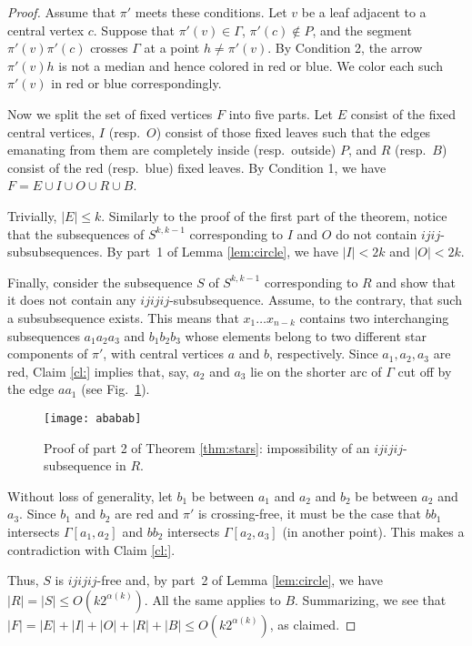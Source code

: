 \documentclass[reqno,12pt]{amsart}
\newcounter{claim}
\begin{document}
\begin{proof}
Assume that $\pi'$ meets these conditions.
Let $v$ be a leaf adjacent to a central
vertex $c$. Suppose that $\pi'(v)\in\Gamma$, $\pi'(c)\notin P$, and the segment
$\pi'(v)\pi'(c)$ crosses $\Gamma$ at a point $h\ne\pi'(v)$. By Condition 2,
the arrow $\pi'(v)h$ is not a median and hence colored in red or blue. 
We color each such $\pi'(v)$ in red or blue correspondingly.

Now we split the set of fixed vertices $F$ into five parts. 
Let $E$ consist of the fixed central vertices,
$I$ (resp.\ $O$) consist of those fixed leaves such that the edges emanating
from them are completely inside (resp.\ outside) $P$, and
$R$ (resp.\ $B$) consist of the red (resp.\ blue) fixed leaves.
By Condition 1, we have $F=E\cup I\cup O\cup R\cup B$.


Trivially, $|E|\le k$. Similarly to the proof of the first part of the theorem,
notice that the subsequences of $S^{k,k-1}$ corresponding to $I$ and $O$
do not contain $ijij$-subsubsequences. By part~1 of Lemma \ref{lem:circle},
we have $|I|<2k$ and $|O|<2k$. 

Finally, consider the subsequence $S$ of $S^{k,k-1}$ corresponding to $R$
and show that it does not contain any $ijijij$-subsubsequence.
Assume, to the contrary, that such a subsubsequence exists.
This means that $x_1\ldots x_{n-k}$ contains two interchanging subsequences
$a_1a_2a_3$ and $b_1b_2b_3$ whose elements belong to two different star components
of $\pi'$, with central vertices $a$ and $b$, respectively. 
Since $a_1,a_2,a_3$ are red, Claim \ref{cl:} implies that, say, $a_2$ and $a_3$
lie on the shorter arc of $\Gamma$ cut off by the edge $aa_1$ (see Fig.~\ref{fig:ababab}).

\begin{figure}
\centerline{\texttt{[image: ababab]}}
\caption{Proof of part 2 of Theorem \protect\ref{thm:stars}: 
impossibility of an $ijijij$-subsequence in $R$.}
\label{fig:ababab}
\end{figure}

Without loss of generality, let $b_1$ be between $a_1$ and $a_2$ and $b_2$
be between $a_2$ and $a_3$. Since $b_1$ and $b_2$ are red and $\pi'$ is
crossing-free, it must be the case that $bb_1$ intersects $\Gamma[a_1,a_2]$
and $bb_2$ intersects $\Gamma[a_2,a_3]$ (in another point). This makes a
contradiction with Claim \ref{cl:}.

Thus, $S$ is $ijijij$-free and, by part~2 of Lemma \ref{lem:circle}, we have
$|R|=|S|\le O(k2^{\alpha(k)})$. All the same applies to $B$.
Summarizing, we see that $|F|=|E|+|I|+|O|+|R|+|B|\le O(k2^{\alpha(k)})$, as claimed.
\end{proof}
\end{document}
